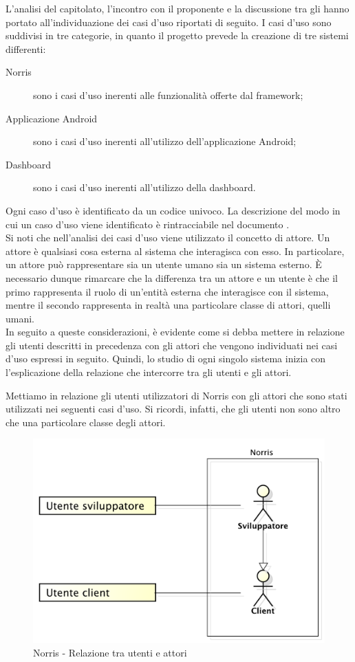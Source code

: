 L’analisi del capitolato, l’incontro con il proponente e la discussione tra gli  hanno portato all'individuazione dei casi d'uso riportati di seguito. 
I casi d'uso sono suddivisi in tre categorie, in quanto il progetto prevede la creazione di tre sistemi differenti:
\begin{description}
	\item[Norris] sono i casi d'uso inerenti alle funzionalità offerte dal framework;
	\item[Applicazione Android] sono i casi d'uso inerenti all'utilizzo dell'applicazione Android;
	\item[Dashboard] sono i casi d'uso inerenti all'utilizzo della dashboard.
\end{description}
Ogni caso d'uso è identificato da un codice univoco. La descrizione del modo in cui un caso d'uso viene identificato è rintracciabile nel documento .\\
Si noti che nell'analisi dei casi d'uso viene utilizzato il concetto di attore. Un attore è qualsiasi cosa esterna al sistema che interagisca con esso. In particolare, un attore può rappresentare sia un utente umano sia un sistema esterno. È necessario dunque rimarcare che la differenza tra un attore e un utente è che il primo rappresenta il ruolo di un'entità esterna che interagisce con il sistema, mentre il secondo rappresenta in realtà una particolare classe di attori, quelli umani.\\
In seguito a queste considerazioni, è evidente come si debba mettere in relazione gli utenti descritti in precedenza con gli attori che vengono individuati nei casi d'uso espressi in seguito. Quindi, lo studio di ogni singolo sistema inizia con l'esplicazione della relazione che intercorre tra gli utenti e gli attori.

	Mettiamo in relazione gli utenti utilizzatori di Norris con gli attori che sono stati utilizzati nei seguenti casi d'uso. Si ricordi, infatti, che gli utenti non sono altro che una particolare classe degli attori.
	\begin{figure}[H]
		\centering
		\includegraphics[scale=0.4]{Pics/UtentiAttoriNorris}
		\caption{Norris - Relazione tra utenti e attori}
	\end{figure}
	

